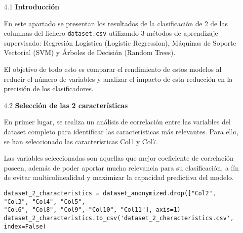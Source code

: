 \documentclass{article}
\begin{document}
\bigskip

\begin{itemize}

\item[4.1]  {\bf Introducci\'on}

En este apartado se presentan los resultados de la clasificaci\'on de 2 de las columnas del fichero \texttt{dataset.csv} utilizando 3 m\'etodos de aprendizaje supervisado: Regresi\'on Log\'istica (Logistic Regression), M\'aquinas de Soporte Vectorial (SVM) y \'Arboles de Decisi\'on (Random Trees).

El objetivo de todo esto es comparar el rendimiento de estos modelos al reducir el n\'umero de variables y analizar el impacto de esta reducci\'on en la precisi\'on de los clasificadores.

\end{itemize}

\bigskip

\begin{itemize}

\item[4.2]  {\bf Selecci\'on de las 2 caracter\'isticas}

En primer lugar, se realiza un análisis de correlaci\'on entre las variables del dataset completo para identificar las caracter\'isticas más relevantes. Para ello, se han seleccionado las caracter\'isticas Col1 y Col7.

Las variables seleccionadas son aquellas que mejor coeficiente de correlaci\'on poseen, adem\'as de poder aportar mucha relevancia para su clasificaci\'on, a f\'in de evitar multicolinealidad y maximizar la capacidad predictiva del modelo.

\begin{tcolorbox}[width=14cm]
\begin{scriptsize}
\begin{verbatim}
dataset_2_characteristics = dataset_anonymized.drop(["Col2", "Col3", "Col4", "Col5",
"Col6", "Col8", "Col9", "Col10", "Col11"], axis=1)
dataset_2_characteristics.to_csv('dataset_2_characteristics.csv', index=False)
\end{verbatim}
\end{scriptsize}
\end{tcolorbox}

\end{itemize}

\bigskip
\end{document}
